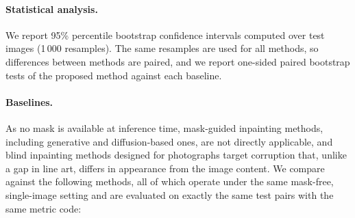 \documentclass[11pt]{article}
\begin{document}
\paragraph{Statistical analysis.} We report 95\% percentile bootstrap confidence
intervals \citep{efron1994bootstrap} computed over test images (1\,000 resamples).
The same resamples are used for all methods, so differences between methods are
paired, and we report one-sided paired bootstrap tests of the proposed method against
each baseline.

\paragraph{Baselines.} As no mask is available at inference time, mask-guided
inpainting methods, including generative and diffusion-based ones, are not directly
applicable, and blind inpainting methods designed for photographs target corruption
that, unlike a gap in line art, differs in appearance from the image content. We compare against the following
methods, all of which operate under the same mask-free, single-image setting and are
evaluated on exactly the same test pairs with the same metric code:
\end{document}
